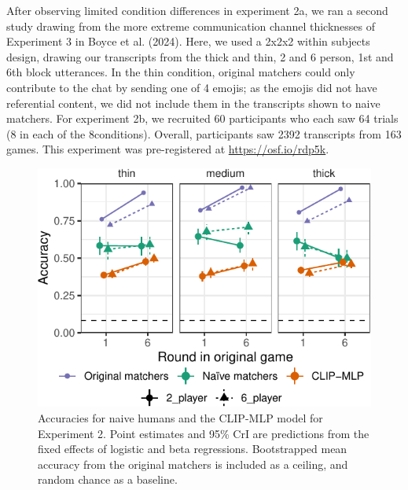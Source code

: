 \documentclass[10pt, letterpaper]{article}
\begin{document}
After observing limited condition differences in experiment 2a, we ran a
second study drawing from the more extreme communication channel
thicknesses of Experiment 3 in Boyce et al. (2024). Here, we used a
2x2x2 within subjects design, drawing our transcripts from the thick and
thin, 2 and 6 person, 1st and 6th block utterances. In the thin
condition, original matchers could only contribute to the chat by
sending one of 4 emojis; as the emojis did not have referential content,
we did not include them in the transcripts shown to naive matchers. For
experiment 2b, we recruited 60 participants who each saw 64 trials (8 in
each of the 8conditions). Overall, participants saw 2392 transcripts
from 163 games. This experiment was pre-registered at
\url{https://osf.io/rdp5k}.

\begin{CodeChunk}
\begin{figure}[t]

{\centering \includegraphics[width=0.9\linewidth]{figs/fig-condition-1} 

}

\caption[Accuracies for naive humans and the CLIP-MLP model for Experiment 2]{Accuracies for naive humans and the CLIP-MLP model for Experiment 2. Point estimates and 95\% CrI are predictions from the fixed effects of logistic and beta regressions. Bootstrapped mean accuracy from the original matchers is included as a ceiling, and random chance as a baseline. \label{expt2-condition}}\label{fig:fig-condition}
\end{figure}
\end{CodeChunk}
\end{document}
